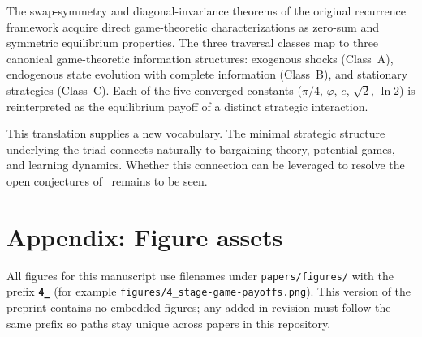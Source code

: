 \documentclass[12pt]{article}
\theoremstyle{definition}
\theoremstyle{remark}
\begin{document}
The swap-symmetry and diagonal-invariance theorems of the original recurrence framework
acquire direct game-theoretic characterizations as zero-sum and symmetric equilibrium
properties.  The three traversal classes map to three canonical game-theoretic
information structures: exogenous shocks (Class~A), endogenous state evolution with
complete information (Class~B), and stationary strategies (Class~C).  Each of the five
converged constants ($\pi/4$, $\varphi$, $e$, $\sqrt{2}$, $\ln 2$) is reinterpreted as
the equilibrium payoff of a distinct strategic interaction.

This translation supplies a new vocabulary.  The minimal strategic structure underlying
the triad connects naturally to bargaining theory, potential games, and learning
dynamics.  Whether this connection can be leveraged to resolve the open conjectures
of~\cite{Mil26a} remains to be seen.




\appendix

\section*{Appendix: Figure assets}

All figures for this manuscript use filenames under \texttt{papers/figures/} with the
prefix \textbf{\texttt{4\_}} (for example
\texttt{figures/4\_stage-game-payoffs.png}).  This version of the preprint contains no
embedded figures; any added in revision must follow the same prefix so paths stay unique
across papers in this repository.
\end{document}

